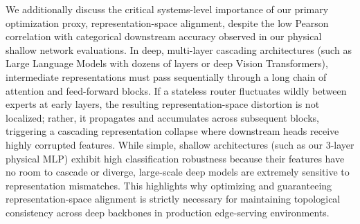 We additionally discuss the critical systems-level importance of our primary optimization proxy, representation-space alignment, despite the low Pearson correlation with categorical downstream accuracy observed in our physical shallow network evaluations. In deep, multi-layer cascading architectures (such as Large Language Models with dozens of layers or deep Vision Transformers), intermediate representations must pass sequentially through a long chain of attention and feed-forward blocks. If a stateless router fluctuates wildly between experts at early layers, the resulting representation-space distortion is not localized; rather, it propagates and accumulates across subsequent blocks, triggering a cascading representation collapse where downstream heads receive highly corrupted features. While simple, shallow architectures (such as our 3-layer physical MLP) exhibit high classification robustness because their features have no room to cascade or diverge, large-scale deep models are extremely sensitive to representation mismatches. This highlights why optimizing and guaranteeing representation-space alignment is strictly necessary for maintaining topological consistency across deep backbones in production edge-serving environments.
